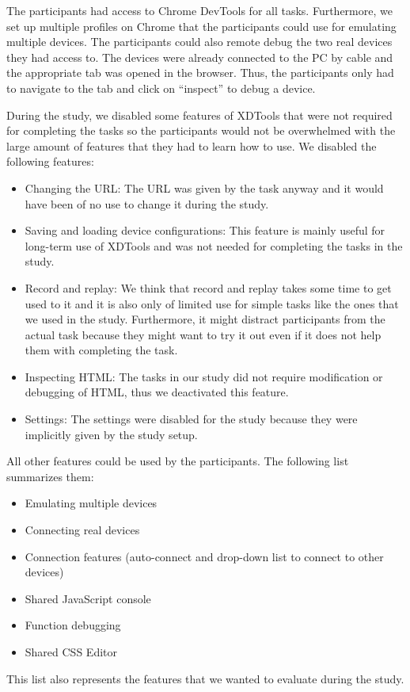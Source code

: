 The participants had access to Chrome DevTools for all tasks. Furthermore, we set up multiple profiles on Chrome that the participants could use for emulating multiple devices. The participants could also remote debug the two real devices they had access to. The devices were already connected to the PC by cable and the appropriate tab was opened in the browser. Thus, the participants only had to navigate to the tab and click on ``inspect'' to debug a device. 

During the study, we disabled some features of XDTools that were not required for completing the tasks so the participants would not be overwhelmed with the large amount of features that they had to learn how to use. We disabled the following features:
\begin{itemize}
	\item Changing the URL: The URL was given by the task anyway and it would have been of no use to change it during the study.
	\item Saving and loading device configurations: This feature is mainly useful for long-term use of XDTools and was not needed for completing the tasks in the study.
	\item Record and replay: We think that record and replay takes some time to get used to it and it is also only of limited use for simple tasks like the ones that we used in the study. Furthermore, it might distract participants from the actual task because they might want to try it out even if it does not help them with completing the task.
	\item Inspecting HTML: The tasks in our study did not require modification or debugging of HTML, thus we deactivated this feature.
	\item Settings: The settings were disabled for the study because they were implicitly given by the study setup.
\end{itemize}

All other features could be used by the participants. The following list summarizes them:
\begin{itemize}
	\item Emulating multiple devices
	\item Connecting real devices
	\item Connection features (auto-connect and drop-down list to connect to other devices)
	\item Shared JavaScript console
	\item Function debugging
	\item Shared CSS Editor
\end{itemize}
This list also represents the features that we wanted to evaluate during the study.


